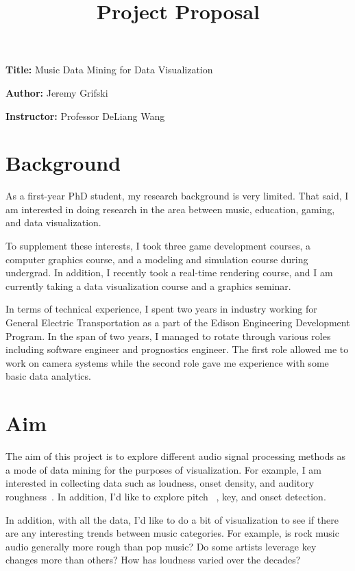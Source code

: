 \documentclass[12pt, a4paper]{article}
\title{Project Proposal}
\author{}
\date{}
\newcommand{\namelistlabel}[1]{\mbox{#1}\hfil}
\newenvironment{namelist}[1]{%
\begin{list}{}
    {
        \let\makelabel\namelistlabel
        \settowidth{\labelwidth}{#1}
        \setlength{\leftmargin}{1.1\labelwidth}
    }
  }{%
\end{list}}
\begin{document}
\maketitle

\begin{namelist}{xxxxxxxxxxxx}
\item[{\bf Title:}]
	Music Data Mining for Data Visualization
\item[{\bf Author:}]
	Jeremy Grifski
\item[{\bf Instructor:}]
	Professor DeLiang Wang
\end{namelist}

\section*{Background}

As a first-year PhD student, my research background is very limited. That said,
I am interested in doing research in the area between music, education, gaming,
and data visualization.

To supplement these interests, I took three game development courses, a
computer graphics course, and a modeling and simulation course during undergrad.
In addition, I recently took a real-time rendering course, and I am
currently taking a data visualization course and a graphics seminar.

In terms of technical experience, I spent two years in industry working for
General Electric Transportation as a part of the Edison Engineering Development
Program. In the span of two years, I managed to rotate through various roles
including software engineer and prognostics engineer. The first role allowed
me to work on camera systems while the second role gave me experience with
some basic data analytics.

\section*{Aim}

The aim of this project is to explore different audio signal processing methods
as a mode of data mining for the purposes of visualization. For example, I am
interested in collecting data such as loudness, onset density, and auditory
roughness~\cite{jeong}. In addition, I'd like to explore pitch~\cite{cuadra}
\cite{rabiner}, key, and onset detection.

In addition, with all the data, I'd like to do a bit of visualization to see
if there are any interesting trends between music categories. For example,
is rock music audio generally more rough than pop music? Do some artists
leverage key changes more than others? How has loudness varied over the
decades?
\end{document}
